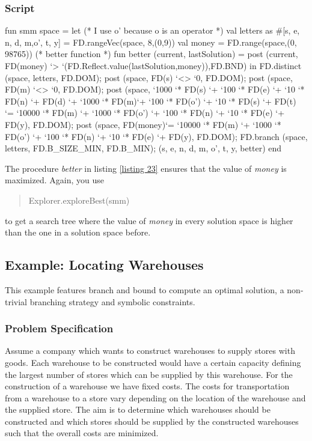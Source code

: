 \documentclass[a4paper]{scrartcl}
\begin{document}
\subsubsection{Script}
\begin{myverbatim}
fun smm space =
  let
    (* I use o' because o is an operator *)
    val letters as #[s, e, n, d, m,o', t, y] = 
        FD.rangeVec(space, 8,(0,9))
    val money = FD.range(space,(0, 98765))
    (* better function *)
    fun better (current, lastSolution) =
         post (current, FD(money) `> 
          `(FD.Reflect.value(lastSolution,money)),FD.BND)
  in
    FD.distinct (space, letters, FD.DOM);
    post (space, FD(s) `<> `0, FD.DOM);
    post (space, FD(m) `<> `0, FD.DOM);
    post (space, `1000 `* FD(s) `+ `100 `* FD(e) `+ 
                 `10 `* FD(n) `+ FD(d) `+  `1000 `* FD(m)`+ 
                 `100 `* FD(o') `+ `10 `* FD(s) `+ FD(t)
             `= `10000 `* FD(m) `+ `1000 `* FD(o') `+ `100 `* 
                  FD(n) `+ `10 `* FD(e) `+ FD(y), FD.DOM);
    post (space, FD(money)`= `10000 `* FD(m) `+ `1000 `* FD(o')
            `+ `100 `* FD(n) `+ `10 `* FD(e) `+ FD(y), FD.DOM);
    FD.branch (space, letters, FD.B_SIZE_MIN, FD.B_MIN);
    ({s, e, n, d, m, o', t, y}, better)
  end
  
\end{myverbatim}

The procedure {\it better} in listing \ref{listing 23} ensures
that the value of {\it money} is maximized. Again, you use
\begin{quote}
Explorer.exploreBest(smm)
\end{quote}
to get a search tree where the value of {\it money} in every 
solution space is higher than the one in a solution space before. 



\newpage
\subsection{Example: Locating Warehouses}
This example features branch and bound to compute an optimal solution, 
a non-trivial branching strategy and symbolic constraints.

\subsubsection{Problem Specification}
Assume a company which wants to construct warehouses to supply 
stores with goods. Each warehouse to be constructed would have 
a certain capacity defining the largest number of stores which 
can be supplied by this warehouse. For the construction of a 
warehouse we have fixed costs. The costs for transportation from 
a warehouse to a store vary depending on the location of the warehouse 
and the supplied store. The aim is to determine which warehouses 
should be constructed and which stores should be supplied by the 
constructed warehouses such that the overall costs are minimized.\\
\end{document}
